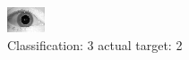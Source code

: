 \begin{figure}[h!]
\begin{center}
\includegraphics[width=0.60\columnwidth]{figures/ID1793_class_3_target_2.png}
\end{center}
\caption{ Classification: 3 actual target: 2}
\label{fig:ID1793_class_3_target_2}
\end{figure}
